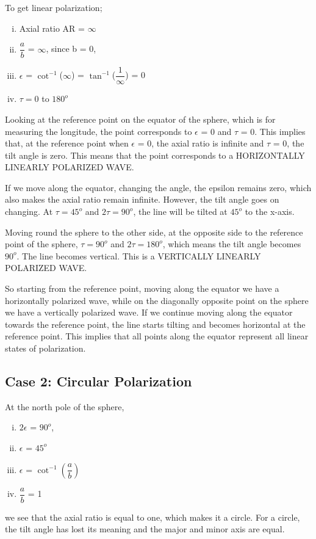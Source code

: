 To get linear polarization;
\begin{enumerate}[(i)]
\item Axial ratio AR = $\infty$
\item $\dfrac{a}{b}$ = $\infty$, since b = 0,
\item $\epsilon$ = $\cot^{-1}$($\infty$) = $\tan^{-1}$($\dfrac{1}{\infty}$) = 0
\item $\tau = 0  $ to $  180^{o} $
\end{enumerate}
Looking at the reference point on the equator of the sphere, which is for measuring the longitude, the point corresponds to $\epsilon$ = 0 and $\tau$ = 0. This implies that, at the reference point when $\epsilon$ = 0, the axial ratio is infinite and $\tau$ = 0, the tilt angle is zero. This means that the point corresponds to a HORIZONTALLY LINEARLY POLARIZED WAVE.

If we move along the equator, changing the angle, the epsilon remains zero, which also makes the axial ratio remain infinite. However, the tilt angle goes on changing. At $\tau = 45^{o}$ and $2\tau = 90^{o}$, the line will be tilted at $45^{o}$ to the x-axis.

Moving round the sphere to the other side, at the opposite side to the reference point of the sphere, $\tau = 90^{o}$ and $2\tau = 180^{o}$, which means the tilt angle becomes $90^{o}$. The line becomes vertical. This is a VERTICALLY LINEARLY POLARIZED WAVE. 

So starting from the reference point, moving along the equator we have a horizontally polarized wave, while on the diagonally opposite point on the sphere we have a vertically polarized wave. If we continue moving along the equator towards the reference point, the line starts tilting and becomes horizontal at the reference point. This implies that all points along the equator represent all linear states of polarization.


\subsection{Case 2: Circular Polarization}
At the north pole of the sphere,
\begin{enumerate}[(i)]
\item 	$2\epsilon$ = $90^{o}$, 
\item	$\epsilon$ = $45^{o}$
\item	$\epsilon$ = $\cot^{-1}(\dfrac{a}{b})$
\item	$\dfrac{a}{b}$ = 1
\end{enumerate}
we see that the axial ratio is equal to one, which makes it a circle. For a circle, the tilt angle has lost its meaning and the major and minor axis are equal.

